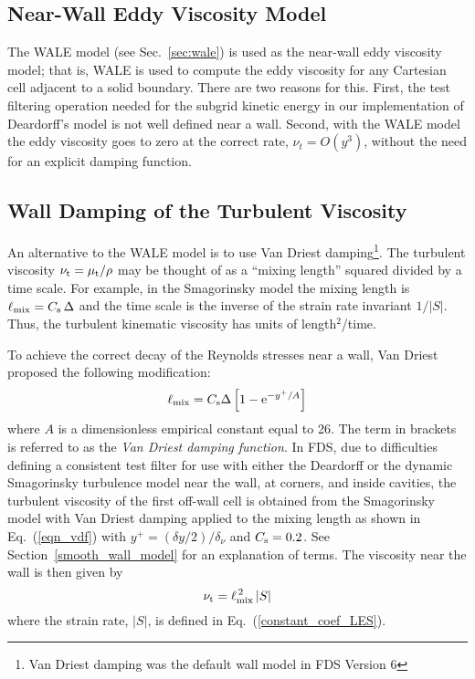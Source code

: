 \subsection{Near-Wall Eddy Viscosity Model}
\label{sec:wall_wale_model}

The WALE model (see Sec.~\ref{sec:wale}) is used as the near-wall eddy viscosity model; that is, WALE is used to compute the eddy viscosity for any Cartesian cell adjacent to a solid boundary.  There are two reasons for this.  First, the test filtering operation needed for the subgrid kinetic energy in our implementation of Deardorff's model is not well defined near a wall.  Second, with the WALE model the eddy viscosity goes to zero at the correct rate, $\nu_t = O(y^3)$, without the need for an explicit damping function.

\subsection{Wall Damping of the Turbulent Viscosity}
\label{sec:wall_damping}

An alternative to the WALE model is to use Van Driest damping\footnote{Van Driest damping was the default wall model in FDS Version 6}. The turbulent viscosity $\nu_{\rm t} = \mu_{\rm t}/\rho$ may be thought of as a ``mixing length'' squared divided by a time scale.  For example, in the Smagorinsky model the mixing length is $\ell_{\rm mix} = C_{\rm s} \,\Delta$ and the time scale is the inverse of the strain rate invariant $1/|S|$.  Thus, the turbulent kinematic viscosity has units of length$^2$/time.

To achieve the correct decay of the Reynolds stresses near a wall, Van Driest~\cite{Wilcox:1} proposed the following modification:
\begin{equation}
\label{eqn_vdf}
\ell_{\rm mix} = C_{\rm s} \Delta \left[ 1 - \mathrm{e}^{-y^+/A} \right]
\end{equation}
where $A$ is a dimensionless empirical constant equal to 26.  The term in brackets is referred to as the {\em Van Driest damping function}. In FDS, due to difficulties defining a consistent test filter for use with either the Deardorff or the dynamic Smagorinsky turbulence model near the wall, at corners, and inside cavities, the turbulent viscosity of the first off-wall cell is obtained from the Smagorinsky model with Van Driest damping applied to the mixing length as shown in Eq.~(\ref{eqn_vdf}) with $y^+ = (\delta y/2)/\delta_\nu$ and $C_{\rm s} = 0.2$.  See Section~\ref{smooth_wall_model} for an explanation of terms. The viscosity near the wall is then given by
\begin{equation}
   \nu_{\rm t} = \ell_{\rm mix}^{\,2}\,|S|  \label{eqn_nearwall_viscosity}
\end{equation}
where the strain rate, $|S|$, is defined in Eq.~(\ref{constant_coef_LES}).

